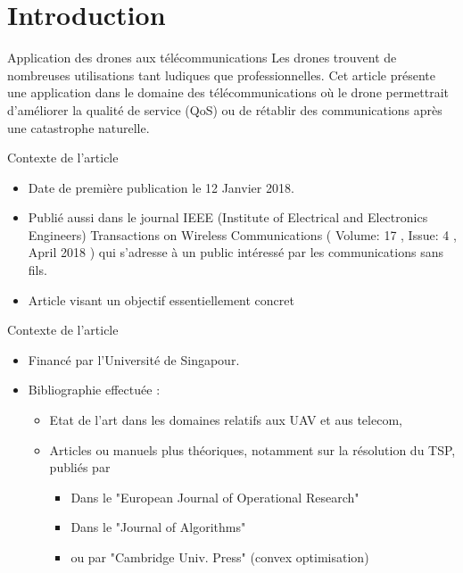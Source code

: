 

\section {Introduction}

\begin{frame}{Application des drones aux télécommunications}
  Les drones trouvent de nombreuses utilisations tant ludiques que professionnelles. Cet article présente une application dans le domaine des télécommunications où le drone permettrait d'améliorer la qualité de service (QoS) ou de rétablir des communications après une catastrophe naturelle. 
 
 
\end{frame}

\begin{frame}{Contexte de l'article}
\begin{itemize}
	
	\item Date de première publication le 12 Janvier 2018.
	
	\item Publié aussi dans le journal IEEE (Institute of Electrical and Electronics Engineers) Transactions on Wireless Communications 
	( Volume: 17 , Issue: 4 , April 2018 ) qui s'adresse à un public intéressé par les communications sans fils.
	
	\item Article visant un objectif essentiellement concret

	
\end{itemize}
\end{frame}

\begin{frame}{Contexte de l'article}
\begin{itemize}
	\item Financé par l'Université de Singapour.

	\item Bibliographie effectuée : 
	\begin{itemize}
		\item Etat de l'art dans les domaines relatifs aux UAV et aus telecom, 
		\item Articles ou manuels plus théoriques, notamment sur la résolution du TSP, publiés par 
 			\begin{itemize}
 				\item  Dans le "European Journal of Operational Research"
 				\item  Dans le "Journal of Algorithms"
 				\item  ou par "Cambridge Univ. Press" (convex optimisation)
 			\end{itemize}
	\end{itemize}


\end{itemize}
\end{frame}
 
